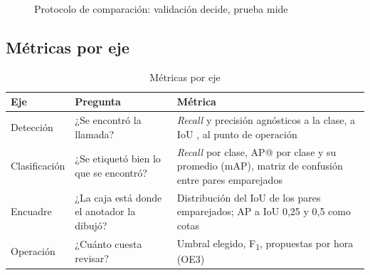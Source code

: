 \documentclass[12pt,a4paper]{article}
\begin{document}
\begin{figure}[htbp]
    \centering
    \caption{Protocolo de comparación: validación decide, prueba mide}
    \label{fig:protocolo}
\end{figure}

\subsection{Métricas por eje}

\begin{table}[htbp]
    \centering
    \caption{Métricas por eje}
    \label{tab:metricas}
    \small
    \begin{tabular}{@{}L{2.4cm}L{5.4cm}L{6.0cm}@{}}
        \toprule
        \textbf{Eje} & \textbf{Pregunta} & \textbf{Métrica} \\
        \midrule
        Detección & ¿Se encontró la llamada? & \textit{Recall} y precisión agnósticos a la clase, a IoU \matchIou{}, al punto de operación \\
        Clasificación & ¿Se etiquetó bien lo que se encontró? & \textit{Recall} por clase, AP@\matchIou{} por clase y su promedio (mAP), matriz de confusión entre pares emparejados \\
        Encuadre & ¿La caja está donde el anotador la dibujó? & Distribución del IoU de los pares emparejados; AP a IoU 0,25 y 0,5 como cotas \\
        Operación & ¿Cuánto cuesta revisar? & Umbral elegido, F\textsubscript{1}, propuestas por hora (OE3) \\
        \bottomrule
    \end{tabular}
\end{table}
\end{document}
